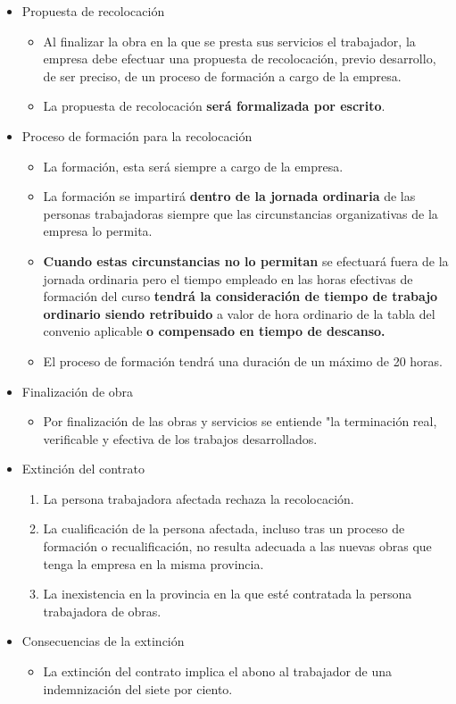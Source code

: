 \documentclass{article}
\begin{document}
	\begin{itemize}
		\item Propuesta de recolocación
		\begin{itemize}
			\item Al finalizar la obra en la que se presta sus servicios el trabajador, la empresa debe efectuar una propuesta de recolocación, previo desarrollo, de ser preciso, de un proceso de formación a cargo de la empresa.
			\item La propuesta de recolocación \textbf{será formalizada por escrito}.
		\end{itemize}
		\item Proceso de formación para la recolocación
		\begin{itemize}
			\item La formación, esta será siempre a cargo de la empresa.
			\item La formación se impartirá \textbf{dentro de la jornada ordinaria} de las personas trabajadoras siempre que las circunstancias organizativas de la empresa lo permita.
			\item \textbf{Cuando estas circunstancias no lo permitan} se efectuará fuera de la jornada ordinaria pero el tiempo empleado en las horas efectivas de formación del curso \textbf{tendrá la consideración de tiempo de trabajo ordinario siendo retribuido} a valor de hora ordinario de la tabla del convenio aplicable \textbf{o compensado en tiempo de descanso.}
			\item El proceso de formación tendrá una duración de un máximo de 20 horas.
		\end{itemize}
		\item Finalización de obra
		\begin{itemize}
			\item Por finalización de las obras y servicios se entiende "la terminación real, verificable y efectiva de los trabajos desarrollados.
		\end{itemize}
		\item Extinción del contrato
		\begin{enumerate}
			\item La persona trabajadora afectada rechaza la recolocación.
			\item La cualificación de la persona afectada, incluso tras un proceso de formación o recualificación, no resulta adecuada a las nuevas obras que tenga la empresa en la misma provincia.
			\item La inexistencia en la provincia en la que esté contratada la persona trabajadora de obras.
		\end{enumerate}
		\item Consecuencias de la extinción
		\begin{itemize}
			\item La extinción del contrato implica el abono al trabajador de una indemnización del siete por ciento.
		\end{itemize}
	\end{itemize}
	
\end{document}
